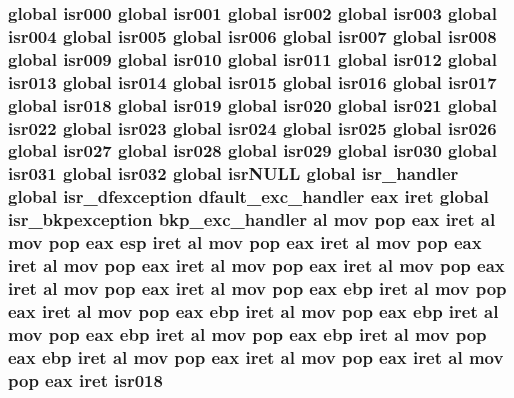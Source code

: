 \subsubsection[{\texorpdfstring{isr018}{isr018}}]{\setlength{\rightskip}{0pt plus 5cm}global {\bf isr000} global {\bf isr001} global {\bf isr002} global {\bf isr003} global {\bf isr004} global {\bf isr005} global {\bf isr006} global {\bf isr007} global {\bf isr008} global {\bf isr009} global {\bf isr010} global {\bf isr011} global {\bf isr012} global {\bf isr013} global {\bf isr014} global {\bf isr015} global {\bf isr016} global {\bf isr017} global isr018 global {\bf isr019} global {\bf isr020} global {\bf isr021} global {\bf isr022} global {\bf isr023} global {\bf isr024} global {\bf isr025} global {\bf isr026} global {\bf isr027} global {\bf isr028} global {\bf isr029} global {\bf isr030} global {\bf isr031} global isr032 global isr\+N\+U\+LL global isr\+\_\+handler global {\bf isr\+\_\+dfexception} {\bf dfault\+\_\+exc\+\_\+handler} eax iret global {\bf isr\+\_\+bkpexception} {\bf bkp\+\_\+exc\+\_\+handler} {\bf al} {\bf mov} pop eax iret {\bf al} {\bf mov} pop eax esp iret {\bf al} {\bf mov} pop eax iret {\bf al} {\bf mov} pop eax iret {\bf al} {\bf mov} pop eax iret {\bf al} {\bf mov} pop eax iret {\bf al} {\bf mov} pop eax iret {\bf al} {\bf mov} pop eax iret {\bf al} {\bf mov} pop eax ebp iret {\bf al} {\bf mov} pop eax iret {\bf al} {\bf mov} pop eax ebp iret {\bf al} {\bf mov} pop eax ebp iret {\bf al} {\bf mov} pop eax ebp iret {\bf al} {\bf mov} pop eax ebp iret {\bf al} {\bf mov} pop eax ebp iret {\bf al} {\bf mov} pop eax iret {\bf al} {\bf mov} pop eax iret {\bf al} {\bf mov} pop eax iret isr018}\hypertarget{isrs_8as_ad86874303ee4aff3b9924d3cd4d8aba4}{}\label{isrs_8as_ad86874303ee4aff3b9924d3cd4d8aba4}
